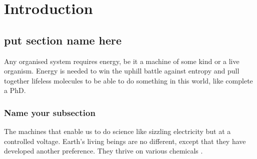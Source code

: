 
\chapter{Introduction}

\ifpdf
    \graphicspath{{introduction/figures/PNG/}{introduction/figures/PDF/}{introduction/figures/}}
\else
    \graphicspath{{introduction/figures/EPS/}{introduction/figures/}}
\fi


\section{put section name here} 
Any organised system requires energy, be it a machine of some kind or a live organism. Energy is needed to win the uphill battle against entropy and pull together lifeless molecules to be able to do something in this world, like complete a PhD.

\subsection{Name your subsection}
The machines that enable us to do science like sizzling electricity but at a controlled voltage. Earth's living beings are no different, except that they have developed another preference. They thrive on various chemicals \citep{name06}. \lipsum





